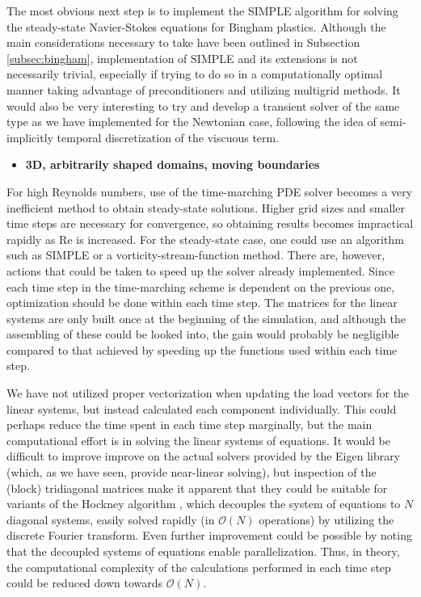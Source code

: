 \documentclass[final,3p,twocolumn]{elsarticle}
\begin{document}
The most obvious next step is to implement the SIMPLE algorithm for solving the
steady-state Navier-Stokes equations for Bingham plastics. Although the main
considerations necessary to take have been outlined in Subsection
\ref{subsec:bingham}, implementation of SIMPLE and its extensions is not
necessarily trivial, especially if trying to do so in a computationally
optimal manner taking advantage of preconditioners and utilizing multigrid
methods. It would also be very interesting to try and develop a transient
solver of the same type as we have implemented for the Newtonian case,
following the idea of semi-implicitly temporal discretization of the viscuous
term. 

\begin{itemize}
    \item {\bf 3D, arbitrarily shaped domains, moving boundaries}
\end{itemize}

For high Reynolds numbers, use of the time-marching PDE solver becomes a very
inefficient method to obtain steady-state solutions. Higher grid sizes and
smaller time steps are necessary for convergence, so obtaining results becomes
impractical rapidly as Re is increased. For the steady-state case, one could
use an algorithm such as SIMPLE or a vorticity-stream-function method.  There
are, however, actions that could be taken to speed up the solver already
implemented. Since each time step in the time-marching scheme is dependent on
the previous one, optimization should be done within each time step. The
matrices for the linear systems are only built once at the beginning of the
simulation, and although the assembling of these could be looked into, the gain
would probably be negligible compared to that achieved by speeding up the
functions used within each time step. 

We have not utilized proper vectorization when updating the load vectors for
the linear systems, but instead calculated each component individually. This
could perhaps reduce the time spent in each time step marginally, but the main
computational effort is in solving the linear systems of equations. It would be
difficult to improve improve on the actual solvers provided by the Eigen
library (which, as we have seen, provide near-linear solving), but inspection
of the (block) tridiagonal matrices make it apparent that they could be
suitable for variants of the Hockney algorithm \cite{hockney1965fast}, which
decouples the system of equations to $N$ diagonal systems, easily solved
rapidly (in $\mathcal{O}(N)$ operations) by utilizing the discrete Fourier
transform. Even further improvement could be possible by noting that the
decoupled systems of equations enable parallelization. Thus, in theory, the
computational complexity of the calculations performed in each time step could
be reduced down towards $\mathcal{O}(N)$. 
\end{document}
